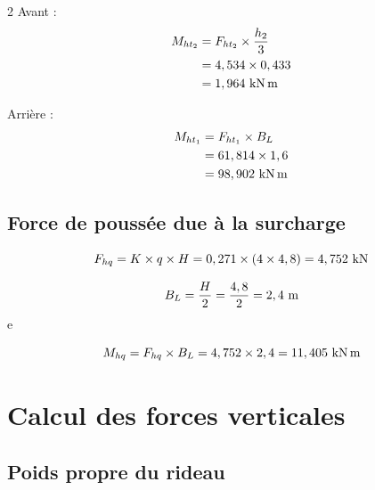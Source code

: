 \documentclass[12pt,a4paper]{report}
\newcommand{\fht}{F_{ht_{1}}}
\newcommand{\fhtt}{F_{ht_{2}}}
\newcommand{\fhq}{F_{hq}}
\newcommand{\mht}{M_{ht_{1}}}
\newcommand{\mhtt}{M_{ht_{2}}}
\newcommand{\mhq}{M_{hq}}
\begin{document}
	
	\begin{tcolorbox}[colback=white, colframe=gray!50, title=\textcolor{black}{\textbf{Calcul du moment par rapport au point "A"}}]
		\begin{multicols}{2}
			Avant :
			\[
			\begin{aligned}
				\mhtt &= \fhtt \times \dfrac{h_{2}}{3} \\
				&= 4,534 \times 0,433 \\
				&= 1,964\knxm
			\end{aligned}
			\]
			
			\columnbreak
			Arrière : 
			\[
			\begin{aligned}
				\mht &= \fht \times B_{L}\\
				&= 61,814 \times 1,6 \\
				&= 98,902\knxm 
			\end{aligned}
			\]
		\end{multicols}
	\end{tcolorbox}
	
	
	\subsection{Force de poussée due à la surcharge}
	
	
	\begin{tcolorbox}[colback=white, colframe=gray!50, title=\textcolor{black}{\textbf{La force}}]
		\[ \fhq = K \times q \times H = 0,271 \times (4 \times 4,8) = 4,752\kn \]
	\end{tcolorbox}
	
	\begin{tcolorbox}[colback=white, colframe=gray!50, title=\textcolor{black}{\textbf{Bras de levier}}]
		\[ B_{L} = \dfrac{H}{2} = \dfrac{4,8}{2} = 2,4\meterl \]e
	\end{tcolorbox}
	
	\begin{tcolorbox}[colback=white, colframe=gray!50, title=\textcolor{black}{\textbf{Le moment/A}}]
		\[ \mhq = \fhq \times B_{L} = 4,752 \times 2,4 = 11,405\knxm \]
	\end{tcolorbox}
	
	
	\section{Calcul des forces verticales}
	
	\subsection{Poids propre du rideau}
	
\end{document}
